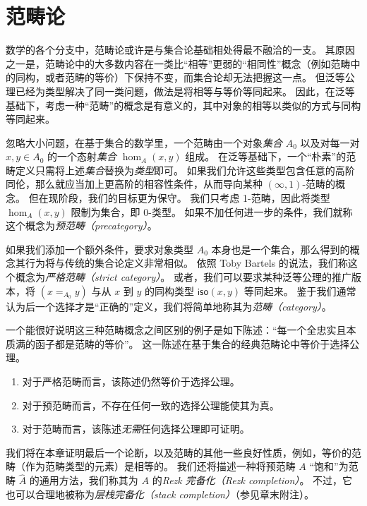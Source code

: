 \chapter{范畴论}
\label{cha:category-theory}

数学的各个分支中，范畴论或许是与集合论基础相处得最不融洽的一支。
其原因之一是，范畴论中的大多数内容在一类比``相等''更弱的``相同性''概念（例如范畴中的同构，或者范畴的等价）下保持不变，而集合论却无法把握这一点。
但泛等公理已经为类型解决了同一类问题，做法是将相等与等价等同起来。
因此，在泛等基础下，考虑一种``范畴''的概念是有意义的，其中对象的相等以类似的方式与同构等同起来。

忽略大小问题，在基于集合的数学里，一个范畴由一个对象\emph{集合} $A_0$ 以及对每一对 $x,y\in A_0$ 的一个态射\emph{集合} $\hom_A(x,y)$ 组成。
在泛等基础下，一个``朴素''的范畴定义只需将上述\emph{集合}替换为\emph{类型}即可。
如果我们允许这些类型包含任意的高阶同伦，那么就应当加上更高阶的相容性条件，从而导向某种 $(\infty,1)$-范畴的概念。
%
但在现阶段，我们的目标更为保守。
我们只考虑 1-范畴，因此将类型 $\hom_A(x,y)$ 限制为集合，即 0-类型。
如果不加任何进一步的条件，我们就称这个概念为\emph{预范畴（precategory）}。

如果我们添加一个额外条件，要求对象类型 $A_0$ 本身也是一个集合，那么得到的概念其行为将与传统的集合论定义非常相似。
依照 Toby Bartels 的说法，我们称这个概念为\emph{严格范畴（strict category）}。
%
或者，我们可以要求某种泛等公理的推广版本，将 $(x=_{A_0} y)$ 与从 $x$ 到 $y$ 的同构类型 $\mathsf{iso}(x,y)$ 等同起来。
鉴于我们通常认为后一个选择才是``正确的''定义，我们将简单地称其为\emph{范畴（category）}。

一个能很好说明这三种范畴概念之间区别的例子是如下陈述：``每一个全忠实且本质满的函子都是范畴的等价''。
这一陈述在基于集合的经典范畴论中等价于选择公理。
%
%
%


\begin{enumerate}
\item 对于严格范畴而言，该陈述仍然等价于选择公理。
\item 对于预范畴而言，不存在任何一致的选择公理能使其为真。
\item 对于范畴而言，该陈述\emph{无需}任何选择公理即可证明。
\end{enumerate}


我们将在本章证明最后一个论断，以及范畴的其他一些良好性质，例如，等价的范畴（作为范畴类型的元素）是相等的。
我们还将描述一种将预范畴 $A$ ``饱和''为范畴 $\widehat A$ 的通用方法，我们称其为 $A$ 的\emph{Rezk 完备化（Rezk completion）}。
%
不过，它也可以合理地被称为\emph{层栈完备化（stack completion）}（参见章末附注）。

